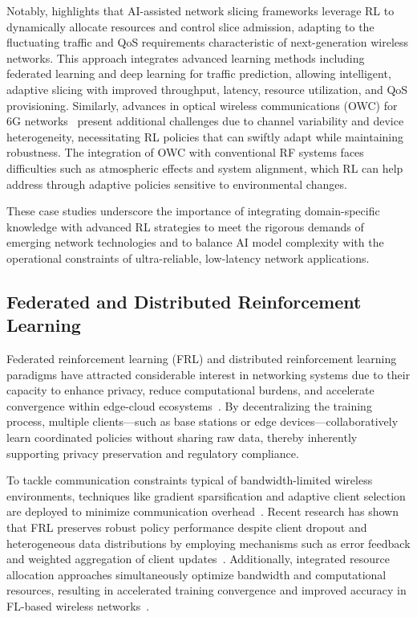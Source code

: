 \documentclass[sigconf]{acmart}
\begin{document}
Notably, \cite{ref6} highlights that AI-assisted network slicing frameworks leverage RL to dynamically allocate resources and control slice admission, adapting to the fluctuating traffic and QoS requirements characteristic of next-generation wireless networks. This approach integrates advanced learning methods including federated learning and deep learning for traffic prediction, allowing intelligent, adaptive slicing with improved throughput, latency, resource utilization, and QoS provisioning. Similarly, advances in optical wireless communications (OWC) for 6G networks~\cite{ref14} present additional challenges due to channel variability and device heterogeneity, necessitating RL policies that can swiftly adapt while maintaining robustness. The integration of OWC with conventional RF systems faces difficulties such as atmospheric effects and system alignment, which RL can help address through adaptive policies sensitive to environmental changes.

These case studies underscore the importance of integrating domain-specific knowledge with advanced RL strategies to meet the rigorous demands of emerging network technologies and to balance AI model complexity with the operational constraints of ultra-reliable, low-latency network applications.

\subsection{Federated and Distributed Reinforcement Learning}

Federated reinforcement learning (FRL) and distributed reinforcement learning paradigms have attracted considerable interest in networking systems due to their capacity to enhance privacy, reduce computational burdens, and accelerate convergence within edge-cloud ecosystems~\cite{ref49,ref50}. By decentralizing the training process, multiple clients—such as base stations or edge devices—collaboratively learn coordinated policies without sharing raw data, thereby inherently supporting privacy preservation and regulatory compliance.

To tackle communication constraints typical of bandwidth-limited wireless environments, techniques like gradient sparsification and adaptive client selection are deployed to minimize communication overhead~\cite{ref49}. Recent research has shown that FRL preserves robust policy performance despite client dropout and heterogeneous data distributions by employing mechanisms such as error feedback and weighted aggregation of client updates~\cite{ref49}. Additionally, integrated resource allocation approaches simultaneously optimize bandwidth and computational resources, resulting in accelerated training convergence and improved accuracy in FL-based wireless networks~\cite{ref50}.
\end{document}
